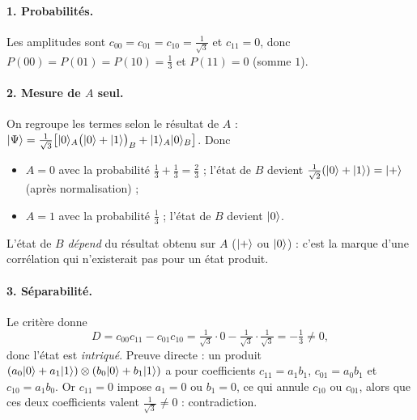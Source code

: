 \begin{correction}
\paragraph{1. Probabilités.} Les amplitudes sont $c_{00}=c_{01}=c_{10}=\frac{1}{\sqrt3}$ et $c_{11}=0$, donc
$P(00)=P(01)=P(10)=\frac13$ et $P(11)=0$ (somme $1$).

\paragraph{2. Mesure de $A$ seul.} On regroupe les termes selon le résultat de $A$ :
$|\Psi\rangle=\frac{1}{\sqrt3}\big[|0\rangle_A\big(|0\rangle+|1\rangle\big)_B+|1\rangle_A|0\rangle_B\big]$. Donc
\begin{itemize}[nosep]
  \item $A=0$ avec la probabilité $\frac13+\frac13=\frac23$ ; l'état de $B$ devient
        $\frac{1}{\sqrt2}(|0\rangle+|1\rangle)=|+\rangle$ (après normalisation) ;
  \item $A=1$ avec la probabilité $\frac13$ ; l'état de $B$ devient $|0\rangle$.
\end{itemize}
L'état de $B$ \emph{dépend} du résultat obtenu sur $A$ ($|+\rangle$ ou $|0\rangle$) : c'est la marque d'une
corrélation qui n'existerait pas pour un état produit.

\paragraph{3. Séparabilité.} Le critère donne
\[
  D=c_{00}c_{11}-c_{01}c_{10}=\tfrac{1}{\sqrt3}\cdot0-\tfrac{1}{\sqrt3}\cdot\tfrac{1}{\sqrt3}=-\tfrac13\neq0,
\]
donc l'état est \emph{intriqué}. Preuve directe : un produit
$(a_0|0\rangle+a_1|1\rangle)\otimes(b_0|0\rangle+b_1|1\rangle)$ a pour coefficients $c_{11}=a_1b_1$,
$c_{01}=a_0b_1$ et $c_{10}=a_1b_0$. Or $c_{11}=0$ impose $a_1=0$ ou $b_1=0$, ce qui annule $c_{10}$ ou
$c_{01}$, alors que ces deux coefficients valent $\frac{1}{\sqrt3}\neq0$ : contradiction.


\end{correction}
